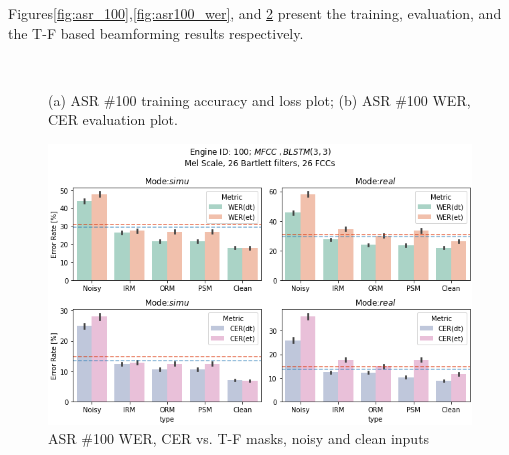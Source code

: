 \bigskip

Figures\;\ref{fig:asr_100},\;\ref{fig:asr100_wer}, and \ref{fig:asr100_wer_masks}
present the training, evaluation, and the 
T-F based beamforming results respectively. 

\begin{figure}[H]
    \centering
    \\
    \vspace{-0.3cm}
    \caption{(a) ASR \#100 training accuracy and loss plot;\;\;
        (b) ASR \#100 WER, CER evaluation plot.}\label{fig:asr100_wer_subplot} 
\end{figure}

\begin{figure}[H]
    \centering
    \includegraphics[width=0.95\linewidth]{ASR/images/asr100_wer_masks.png}
    \caption{ASR \#100 WER, CER vs. T-F masks, noisy and clean inputs }\label{fig:asr100_wer_masks}
\end{figure}

